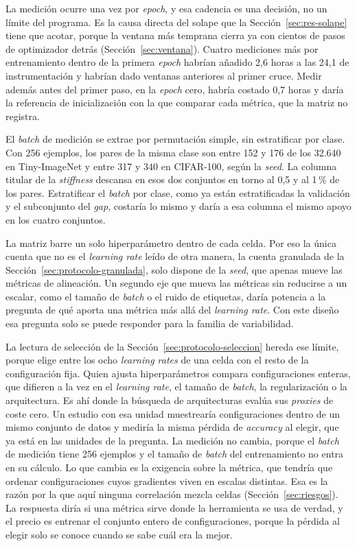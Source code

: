 La medición ocurre una vez por \emph{epoch}, y esa cadencia es una decisión, no un límite del programa. Es la causa directa del solape que la Sección~\ref{sec:res-solape} tiene que acotar, porque la ventana más temprana cierra ya con cientos de pasos de optimizador detrás (Sección~\ref{sec:ventana}). Cuatro mediciones más por entrenamiento dentro de la primera \emph{epoch} habrían añadido 2,6 horas a las 24,1 de instrumentación y habrían dado ventanas anteriores al primer cruce. Medir además antes del primer paso, en la \emph{epoch} cero, habría costado 0,7 horas y daría la referencia de inicialización con la que comparar cada métrica, que la matriz no registra.

El \emph{batch} de medición se extrae por permutación simple, sin estratificar por clase. Con 256 ejemplos, los pares de la misma clase son entre 152 y 176 de los 32.640 en Tiny-ImageNet y entre 317 y 340 en CIFAR-100, según la \emph{seed}. La columna titular de la \emph{stiffness} descansa en esos dos conjuntos en torno al 0,5 y al 1\,\% de los pares. Estratificar el \emph{batch} por clase, como ya están estratificadas la validación y el subconjunto del \emph{gap}, costaría lo mismo y daría a esa columna el mismo apoyo en los cuatro conjuntos.

La matriz barre un solo hiperparámetro dentro de cada celda. Por eso la única cuenta que no es el \emph{learning rate} leído de otra manera, la cuenta granulada de la Sección~\ref{sec:protocolo-granulada}, solo dispone de la \emph{seed}, que apenas mueve las métricas de alineación. Un segundo eje que mueva las métricas sin reducirse a un escalar, como el tamaño de \emph{batch} o el ruido de etiquetas, daría potencia a la pregunta de qué aporta una métrica más allá del \emph{learning rate}. Con este diseño esa pregunta solo se puede responder para la familia de variabilidad.

La lectura de selección de la Sección~\ref{sec:protocolo-seleccion} hereda ese límite, porque elige entre los ocho \emph{learning rates} de una celda con el resto de la configuración fija. Quien ajusta hiperparámetros compara configuraciones enteras, que difieren a la vez en el \emph{learning rate}, el tamaño de \emph{batch}, la regularización o la arquitectura. Es ahí donde la búsqueda de arquitecturas evalúa sus \emph{proxies} de coste cero. Un estudio con esa unidad muestrearía configuraciones dentro de un mismo conjunto de datos y mediría la misma pérdida de \emph{accuracy} al elegir, que ya está en las unidades de la pregunta. La medición no cambia, porque el \emph{batch} de medición tiene 256 ejemplos y el tamaño de \emph{batch} del entrenamiento no entra en su cálculo. Lo que cambia es la exigencia sobre la métrica, que tendría que ordenar configuraciones cuyos gradientes viven en escalas distintas. Esa es la razón por la que aquí ninguna correlación mezcla celdas (Sección~\ref{sec:riesgos}). La respuesta diría si una métrica sirve donde la herramienta se usa de verdad, y el precio es entrenar el conjunto entero de configuraciones, porque la pérdida al elegir solo se conoce cuando se sabe cuál era la mejor.
